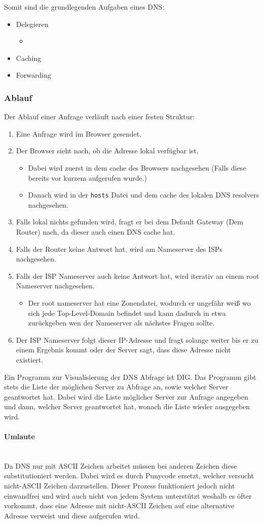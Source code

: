 \documentclass{article}
\newcommand{\paragraphlb}[1]{\paragraph{#1}\mbox{}\\}
\begin{document}
	 Somit sind die grundlegenden Aufgaben eines DNS:
	 \begin{itemize}
	 	\item{Delegieren}
	 	\begin{itemize}
	 		\item{}
	 	\end{itemize}
	 	\item{Caching}
	 	\item{Forwarding}
	 \end{itemize}

	 \subsubsection{Ablauf}
	 Der Ablauf einer Anfrage verläuft nach einer festen Struktur:
	 \begin{enumerate}
	 	\item{Eine Anfrage wird im Browser gesendet.}
	 	\item{Der Browser sieht nach, ob die Adresse lokal verfügbar ist.}
	 	\begin{itemize}
	 		\item{Dabei wird zuerst in dem cache des Browsers nachgesehen (Falls diese bereits vor kurzem aufgerufen wurde.)}
	 		\item{Danach wird in der \verb|hosts| Datei und dem cache des lokalen DNS resolvers nachgesehen. }
	 	\end{itemize}
	 	\item{Falls lokal nichts gefunden wird, fragt er bei dem Default Gateway (Dem Router) nach, da dieser auch einen DNS cache hat.}
	 	\item{Falls der Router keine Antwort hat, wird am Nameserver des ISPs nachgesehen.}
	 	\item{Falls der ISP Nameserver auch keine Antwort hat, wird iterativ an einem root Nameserver nachgesehen.}
	 	\begin{itemize}
	 		\item{Der root nameserver hat eine Zonendatei, wodurch er ungefähr weiß wo sich jede Top-Level-Domain befindet und kann dadurch in etwa zurückgeben wen der Nameserver als nächstes Fragen sollte.}
	 	\end{itemize}
	 	\item{Der ISP Nameserver folgt dieser IP-Adresse und fragt solange weiter bis er zu einem Ergebnis kommt oder der Server sagt, dass diese Adresse nicht existiert.}
	 \end{enumerate}
	 Ein Programm zur Visualisierung der DNS Abfrage ist DIG. Das Programm gibt stets die Liste der möglichen Server zu Abfrage an, sowie welcher Server geantwortet hat. Dabei wird die Liste möglicher Server zur Anfrage angegeben und dann, welcher Server geantwortet hat, wonach die Liste wieder ausgegeben wird. \\
	 \paragraphlb{Umlaute}
	 Da DNS nur mit ASCII Zeichen arbeitet müssen bei anderen Zeichen diese substitutioniert werden. Dabei wird es durch Punycode ersetzt, welcher versucht nicht-ASCII Zeichen darzustellen. Dieser Prozess funktioniert jedoch nicht einwandfrei und wird auch nicht von jedem System unterstützt weshalb es öfter vorkommt, dass eine Adresse mit nicht-ASCII Zeichen auf eine alternative Adresse verweist und diese aufgerufen wird. \\
\end{document}
